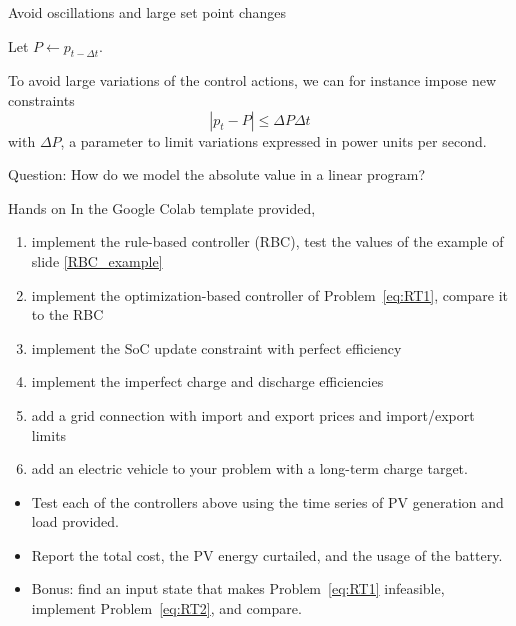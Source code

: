 \begin{frame} {Avoid oscillations and large set point changes} 

    Let $P \leftarrow p_{t-\Delta t}$.
    
    To avoid large variations of the control actions, we can for instance impose new constraints 
    $$| p_t - P| \leq \Delta P \Delta t$$
    with $\Delta P$, a parameter to limit variations expressed in power units per second.

    Question: How do we model the absolute value in a linear program?
\end{frame}


\begin{frame}[allowframebreaks]{Hands on}
    In the Google Colab template provided, 
    \begin{enumerate}
        \item implement the rule-based controller (RBC), test the values of the example of slide \ref{RBC_example}
        \item implement the optimization-based controller of Problem~\eqref{eq:RT1}, compare it to the RBC
        \item implement the SoC update constraint with perfect efficiency
        \item implement the imperfect charge and discharge efficiencies
        \item add a grid connection with import and export prices and import/export limits
        \item add an electric vehicle to your problem with a long-term charge target.
    \end{enumerate}
    \begin{itemize}
        \item Test each of the controllers above using the time series of PV generation and load provided.
        \item Report the total cost, the PV energy curtailed, and the usage of the battery.
        \item Bonus: find an input state that makes Problem~\eqref{eq:RT1} infeasible, implement Problem~\eqref{eq:RT2}, and compare.
    \end{itemize}
    
\end{frame}
